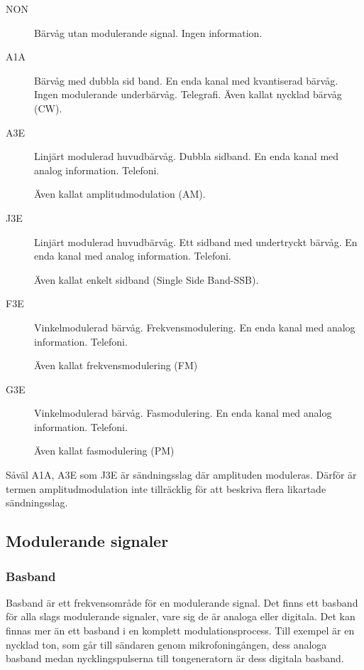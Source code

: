 \begin{description}
\item[NON] Bärvåg utan modulerande signal. Ingen information.

\item[A1A] Bärvåg med dubbla sid band. En enda kanal med kvantiserad bärvåg. Ingen
modulerande underbärvåg. Telegrafi. Även kallat nycklad bärvåg (CW).

\item[A3E] Linjärt modulerad huvudbärvåg. Dubbla sidband. En enda kanal med
analog information. Telefoni.

Även kallat amplitudmodulation (AM).

\item[J3E] Linjärt modulerad huvudbärvåg. Ett sidband med undertryckt bärvåg. En
enda kanal med analog information. Telefoni.

Även kallat enkelt sidband (Single Side Band-SSB).

\item[F3E] Vinkelmodulerad bärvåg. Frekvensmodulering. En enda kanal med analog
information. Telefoni.

Även kallat frekvensmodulering (FM)

\item[G3E] Vinkelmodulerad bärvåg. Fasmodulering. En enda kanal med analog information.
Telefoni.

Även kallat fasmodulering (PM)
\end{description}

Såväl A1A, A3E som J3E är sändningsslag där amplituden moduleras. Därför är
termen amplitudmodulation inte tillräcklig för att beskriva flera likartade sändningsslag.

\subsection{Modulerande signaler}

\subsubsection{Basband}

Basband är ett frekvensområde för en modulerande signal. Det finns ett basband för
alla slags modulerande signaler, vare sig de är analoga eller digitala. Det kan finnas mer
än ett basband i en komplett modulationsprocess. Till exempel är en nycklad ton, som
går till sändaren genom mikrofoningången, dess analoga basband medan nycklingspulserna
till tongeneratorn är dess digitala basband.

